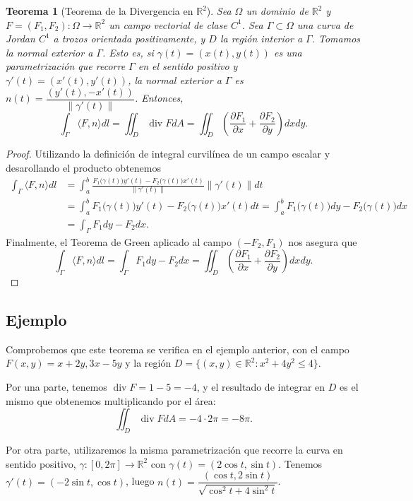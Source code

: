 \documentclass[12pt,spanish]{article}
\newtheorem{theorem}{Teorema}[section]
\theoremstyle{definition}
\theoremstyle{remark}
\begin{document}
\begin{theorem}[Teorema de la Divergencia en $\mathbb{R}^2$]
	Sea $\Omega$ un dominio de $\mathbb{R}^2$ y $F=(F_1,F_2):\Omega\rightarrow\mathbb{R}^2$ un campo vectorial de clase $C^1$.
	Sea $\Gamma\subset\Omega$ una curva de Jordan $C^1$ a trozos orientada positivamente, y $D$ la región interior a $\Gamma$. Tomamos la normal exterior a $\Gamma$. Esto es, si $\gamma(t)=(x(t),y(t))$ es una parametrización que recorre $\Gamma$ en el sentido positivo y $\gamma'(t)=(x'(t),y'(t))$, la normal exterior a $\Gamma$ es $n(t)=\dfrac{(y'(t),-x'(t))}{\|\gamma'(t)\|}$. Entonces, 
	\[\int_\Gamma \langle F,n\rangle dl=\iint_D\operatorname{div} F dA=\iint_D\left(\frac{\partial F_1}{\partial x}+\frac{\partial F_2}{\partial y}\right) dx dy.\]
\end{theorem}

\begin{proof}
	Utilizando la definición de integral curvilínea de un campo escalar y desarollando el producto obtenemos
	\begin{align*}
	\int_\Gamma \langle F,n\rangle dl&=\int_a^b\frac{F_1\big(\gamma(t)\big)y'(t)-F_2\big(\gamma(t)\big)x'(t)}{\|\gamma'(t)\|}\|\gamma'(t)\|dt \\
	&=\int_a^b F_1\big(\gamma(t)\big)y'(t)-F_2\big(\gamma(t)\big)x'(t)dt = \int_a^bF_1\big(\gamma(t)\big)dy-F_2\big(\gamma(t)\big)dx \\
	&=\int_\Gamma F_1 dy-F_2dx.
	\end{align*}
	Finalmente, el Teorema de Green aplicado al campo $(-F_2,F_1)$ nos asegura que 
	\[\int_\Gamma \langle F,n\rangle dl=\int_\Gamma F_1 dy-F_2dx=\iint_D\left(\frac{\partial F_1}{\partial x}+\frac{\partial F_2}{\partial y}\right) dx dy.\]
\end{proof}

\subsection*{Ejemplo}

Comprobemos que este teorema se verifica en el ejemplo anterior, con el campo $F(x,y)=x+2y,3x-5y$ y la región $D=\{(x,y)\in\mathbb{R}^2: x^2+4y^2\leq 4\}$.

Por una parte, tenemos $\operatorname{div}F=1-5=-4$, y el resultado de integrar en $D$ es el mismo que obtenemos multiplicando por el área:
\[\iint_D\operatorname{div} F dA= -4\cdot 2\pi=-8\pi.\]

Por otra parte, utilizaremos la misma parametrización que recorre la curva en sentido positivo, $\gamma:[0,2\pi]\rightarrow\mathbb{R}^2$ con $\gamma(t)=(2\cos t, \sin t)$. Tenemos $\gamma'(t)=(-2\sin t, \cos t)$, luego $n(t)=\dfrac{(\cos t,2\sin t)}{\sqrt{\cos^2 t+4\sin^2 t}}$.
\end{document}

